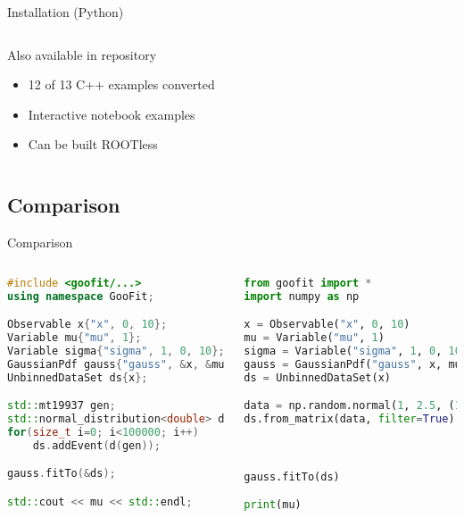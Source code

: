 \documentclass[aspectratio=169, smaller]{beamer}
\begin{document}
\begin{frame}{Installation (Python)}
\begin{columns}[c]
        \begin{block}{Also available in repository}
            \begin{itemize}
                \item 12 of 13 C++ examples converted
                \item Interactive notebook examples
                \item Can be built ROOTless
            \end{itemize}
        \end{block}
    \end{columns}
\end{frame}


\subsection{Comparison}
\begin{frame}[fragile]{Comparison}
    \begin{columns}[c]
        \begin{lstlisting}[language=C++]
#include <goofit/...>
using namespace GooFit;

Observable x{"x", 0, 10};
Variable mu{"mu", 1};
Variable sigma{"sigma", 1, 0, 10};
GaussianPdf gauss{"gauss", &x, &mu, &sigma};
UnbinnedDataSet ds{x};

std::mt19937 gen;
std::normal_distribution<double> d{1, 2.5};
for(size_t i=0; i<100000; i++)
    ds.addEvent(d(gen));

gauss.fitTo(&ds);

std::cout << mu << std::endl;
\end{lstlisting}
        \begin{lstlisting}[language=Python] 
from goofit import *
import numpy as np

x = Observable("x", 0, 10)
mu = Variable("mu", 1)
sigma = Variable("sigma", 1, 0, 10)
gauss = GaussianPdf("gauss", x, mu, sigma)
ds = UnbinnedDataSet(x)

data = np.random.normal(1, 2.5, (100000,1))
ds.from_matrix(data, filter=True)



gauss.fitTo(ds)

print(mu)
        \end{lstlisting}
    \end{columns}
\end{frame}
\end{document}
